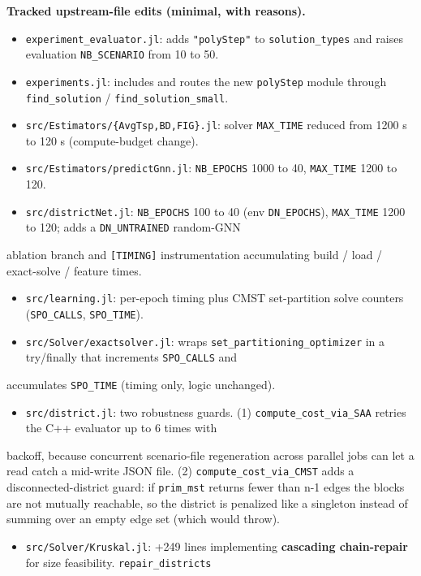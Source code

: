 \documentclass[10pt]{article}
\begin{document}
\textbf{Tracked upstream-file edits (minimal, with reasons).}
\begin{itemize}\setlength{\itemsep}{2pt}
\item \texttt{experiment\_evaluator.jl}: adds \texttt{"polyStep"} to \texttt{solution\_types} and raises evaluation \texttt{NB\_SCENARIO} from 10 to 50.
\item \texttt{experiments.jl}: includes and routes the new \texttt{polyStep} module through \texttt{find\_solution} / \texttt{find\_solution\_small}.
\item \texttt{src/Estimators/\{AvgTsp,BD,FIG\}.jl}: solver \texttt{MAX\_TIME} reduced from 1200 s to 120 s (compute-budget change).
\item \texttt{src/Estimators/predictGnn.jl}: \texttt{NB\_EPOCHS} 1000 to 40, \texttt{MAX\_TIME} 1200 to 120.
\item \texttt{src/districtNet.jl}: \texttt{NB\_EPOCHS} 100 to 40 (env \texttt{DN\_EPOCHS}), \texttt{MAX\_TIME} 1200 to 120; adds a \texttt{DN\_UNTRAINED} random-GNN
\end{itemize}
  ablation branch and \texttt{[TIMING]} instrumentation accumulating build / load / exact-solve / feature times.
\begin{itemize}\setlength{\itemsep}{2pt}
\item \texttt{src/learning.jl}: per-epoch timing plus CMST set-partition solve counters (\texttt{SPO\_CALLS}, \texttt{SPO\_TIME}).
\item \texttt{src/Solver/exactsolver.jl}: wraps \texttt{set\_partitioning\_optimizer} in a try/finally that increments \texttt{SPO\_CALLS} and
\end{itemize}
  accumulates \texttt{SPO\_TIME} (timing only, logic unchanged).
\begin{itemize}\setlength{\itemsep}{2pt}
\item \texttt{src/district.jl}: two robustness guards. (1) \texttt{compute\_cost\_via\_SAA} retries the C++ evaluator up to 6 times with
\end{itemize}
  backoff, because concurrent scenario-file regeneration across parallel jobs can let a read catch a mid-write JSON file.
  (2) \texttt{compute\_cost\_via\_CMST} adds a disconnected-district guard: if \texttt{prim\_mst} returns fewer than n-1 edges the blocks
  are not mutually reachable, so the district is penalized like a singleton instead of summing over an empty edge set
  (which would throw).
\begin{itemize}\setlength{\itemsep}{2pt}
\item \texttt{src/Solver/Kruskal.jl}: +249 lines implementing \textbf{cascading chain-repair} for size feasibility. \texttt{repair\_districts}
\end{itemize}
\end{document}

